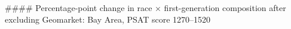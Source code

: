 #### Percentage-point change in race × first-generation composition after excluding Geomarket: Bay Area, PSAT score 1270–1520
